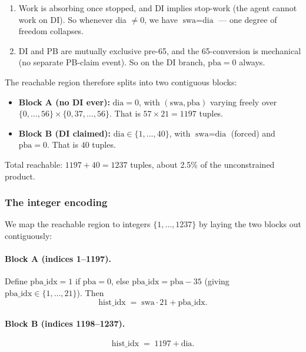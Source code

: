 \begin{enumerate}
 \item Work is absorbing once stopped, and DI implies stop-work (the agent cannot work on DI). So whenever dia $\ne 0$, we have $\text{swa} = \text{dia}$ --- one degree of freedom collapses.
 \item DI and PB are mutually exclusive pre-65, and the 65-conversion is mechanical (no separate PB-claim event). So on the DI branch, $\text{pba} = 0$ always.
\end{enumerate}

The reachable region therefore splits into two contiguous blocks:

\begin{itemize}
 \item \textbf{Block A (no DI ever):} $\text{dia} = 0$, with $(\text{swa}, \text{pba})$ varying freely over $\{0,\ldots,56\} \times \{0, 37, \ldots, 56\}$. That is $57 \times 21 = 1197$ tuples.
 \item \textbf{Block B (DI claimed):} $\text{dia} \in \{1,\ldots,40\}$, with $\text{swa} = \text{dia}$ (forced) and $\text{pba} = 0$. That is $40$ tuples.
\end{itemize}

Total reachable: $1197 + 40 = 1237$ tuples, about 2.5\% of the unconstrained product.

\subsubsection{The integer encoding}

We map the reachable region to integers $\{1,\ldots,1237\}$ by laying the two blocks out contiguously:

\paragraph{Block A (indices 1--1197).} Define $\text{pba\_idx} = 1$ if $\text{pba} = 0$, else $\text{pba\_idx} = \text{pba} - 35$ (giving $\text{pba\_idx}\in\{1,\ldots,21\}$). Then
\[
 \text{hist\_idx} \;=\; \text{swa} \cdot 21 + \text{pba\_idx}.
\]

\paragraph{Block B (indices 1198--1237).}
\[
 \text{hist\_idx} \;=\; 1197 + \text{dia}.
\]

